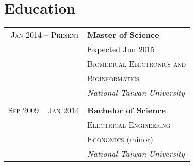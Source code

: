 \documentclass[10pt, a4paper]{article} %
\begin{document}
{\begin{minipage}[t]{0.44\textwidth}




\section{Education}

\begin{tabular}{rl} %


\textsc{Jan 2014 -- Present} & \textbf{Master of Science} \\
& \small Expected Jun 2015 \\
& \textsc{Biomedical Electronics and} \\
& \textsc{Bioinformatics} \\
& \textit{National Taiwan University} \\
&\\


\textsc{Sep 2009 -- Jan 2014} & \textbf{Bachelor of Science} \\
& \textsc{Electrical Engineering} \\
& \textsc{Economics} (minor)\\
& \textit{National Taiwan University}



\end{tabular}
\end{minipage}}
\end{document}
